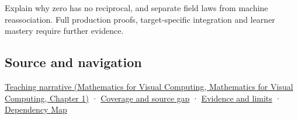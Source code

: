 Explain why zero has no reciprocal, and separate field laws from machine reassociation. Full production proofs, target-specific integration and learner mastery require further evidence.

\subsection{Source and navigation}\label{appendix-52051ad550fe-source-and-navigation}

\href{../02-Mathematics-for-Visual-Computing/main.pdf\#nameddest=01-foundations-i-ch017-numbers-become-a-system-of-permitted-operations}{Teaching narrative (Mathematics for Visual Computing, Mathematics for Visual Computing, Chapter 1)} · \hyperref[appendix-fd090d982a15-phase-6---parts-501-600]{Coverage and source gap} · \hyperref[appendix-a103e7846d21-phase-6---source-analysis-and-verification]{Evidence and limits} · \hyperref[appendix-4ad47bdd269a]{Dependency Map}
